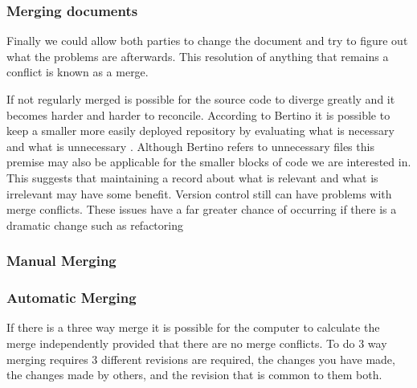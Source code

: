 \subsubsection{Merging documents}
Finally we could allow both parties to change the document and try to figure out what the problems are afterwards.  This resolution of anything that remains a conflict is known as a merge.

If not regularly merged is possible for the source code to diverge greatly and it becomes harder and harder to reconcile.
 According to Bertino it is possible to keep a smaller more easily deployed repository by evaluating what is necessary and what is unnecessary \cite{Bertino2012}. Although Bertino refers to unnecessary files this premise may also be applicable for the smaller blocks of code we are interested in. This suggests that maintaining a record about what is relevant and what is irrelevant may have some benefit. Version control still can have problems with merge conflicts. These issues have a far greater chance of occurring if there is a dramatic change such as refactoring
 
\subsubsection{Manual Merging}


% 
% 

\subsubsection{Automatic Merging}
If there is a three way merge it is possible for the computer to calculate the merge independently provided that there are no merge conflicts.
To do 3 way merging requires 3 different revisions are required, the changes you have made, the changes made by others, and the revision that is common to them both.


% 

